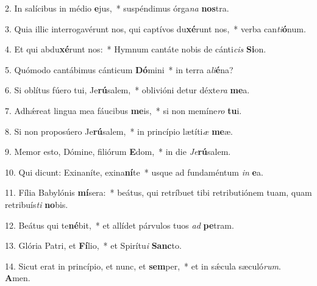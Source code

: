 2. In salícibus in médio \textbf{e}jus,~*  suspéndimus órga\textit{na} \textbf{nos}tra.\

3. Quia illic interrogavérunt nos, qui captívos du\textbf{xé}runt nos,~*  verba can\textit{ti}\textbf{ó}num.\

4. Et qui abdu\textbf{xé}runt nos:~*  Hymnum cantáte nobis de cánti\textit{cis} \textbf{Si}on.\

5. Quómodo cantábimus cánticum \textbf{Dó}mini~*  in terra a\textit{li}\textbf{é}na?\

6. Si oblítus fúero tui, Je\textbf{rú}salem,~*  oblivióni detur déxte\textit{ra} \textbf{me}a.\

7. Adhǽreat lingua mea fáucibus \textbf{me}is,~*  si non memíne\textit{ro} \textbf{tu}i.\

8. Si non proposúero Je\textbf{rú}salem,~*  in princípio lætíti\textit{æ} \textbf{me}æ.\

9. Memor esto, Dómine, filiórum \textbf{E}dom,~*  in die \textit{Je}\textbf{rú}salem.\

10. Qui dicunt: Exinaníte, exina\textbf{ní}te~*  usque ad fundaméntum \textit{in} \textbf{e}a.\

11. Fília Babylónis \textbf{mí}sera:~*  beátus, qui retríbuet tibi retributiónem tuam, quam retribuís\textit{ti} \textbf{no}bis.\

12. Beátus qui te\textbf{né}bit,~*  et allídet párvulos tuos \textit{ad} \textbf{pe}tram.\

13. Glória Patri, et \textbf{Fí}lio,~*  et Spirítu\textit{i} \textbf{Sanc}to.\

14. Sicut erat in princípio, et nunc, et \textbf{sem}per,~*  et in sǽcula sæculó\textit{rum}. \textbf{A}men.\

